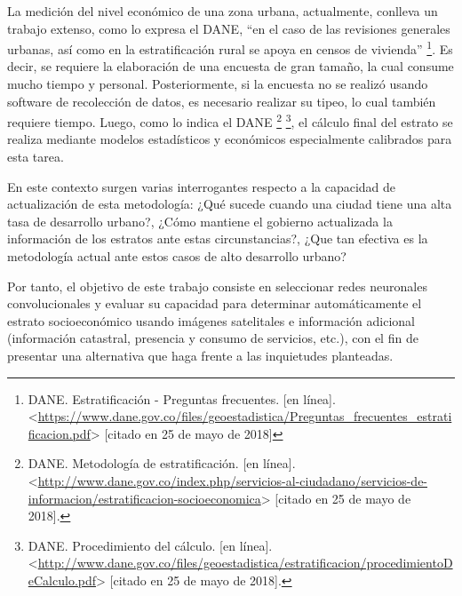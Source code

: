 La medición del nivel económico de una zona urbana, actualmente, conlleva un trabajo extenso, como lo expresa el DANE, “en el caso de las revisiones generales urbanas, así como en la estratificación rural se apoya en censos de vivienda” \footnote[1]{DANE. Estratificación - Preguntas frecuentes. [en línea]. <\url{https://www.dane.gov.co/files/geoestadistica/Preguntas_frecuentes_estratificacion.pdf}> [citado en 25 de mayo de 2018]}. Es decir, se requiere la elaboración de una encuesta de gran tamaño, la cual consume mucho tiempo y personal. Posteriormente, si la encuesta no se realizó usando software de recolección de datos, es necesario realizar su tipeo, lo cual también requiere tiempo. Luego, como lo indica el DANE \footnote[2]{DANE. Metodología de estratificación. [en línea]. <\url{http://www.dane.gov.co/index.php/servicios-al-ciudadano/servicios-de-informacion/estratificacion-socioeconomica}> [citado en 25 de mayo de 2018].} \footnote[3]{DANE. Procedimiento del cálculo. [en línea]. <\url{http://www.dane.gov.co/files/geoestadistica/estratificacion/procedimientoDeCalculo.pdf}> [citado en 25 de mayo de 2018].}, el cálculo final del estrato se realiza mediante modelos estadísticos y económicos especialmente calibrados para esta tarea.
    
En este contexto surgen varias interrogantes respecto a la capacidad de actualización de esta metodología: ¿Qué sucede cuando una ciudad tiene una alta tasa de desarrollo urbano?, ¿Cómo mantiene el gobierno actualizada la información de los estratos ante estas circunstancias?, ¿Que tan efectiva es la metodología actual ante estos casos de alto desarrollo urbano?
   
Por tanto, el objetivo de este trabajo consiste en seleccionar redes neuronales convolucionales y evaluar su capacidad para determinar automáticamente el estrato socioeconómico usando imágenes satelitales e información adicional (información catastral, presencia y consumo de servicios, etc.), con el fin de presentar una alternativa que haga frente a las inquietudes planteadas.
    
